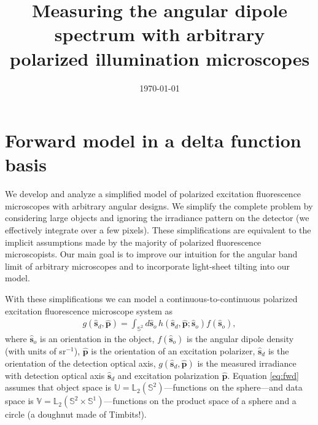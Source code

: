 \documentclass[11pt]{article}
\providecommand{\so}{\mathbf{\hat{s}}_o}
\providecommand{\sd}{\mathbf{\hat{s}}_d}
\providecommand{\pp}{\mathbf{\hat{p}}}
\providecommand{\mbb}[1]{\mathbb{#1}}
\providecommand{\ints}[1]{\int_{\mbb{S}^{#1}}}
\begin{document}
\title{\vspace{-2.5em} Measuring the angular dipole spectrum with arbitrary\\
  polarized illumination microscopes\vspace{-1em}} %
\date{\vspace{-3em}\today\vspace{-1em}}
\maketitle
\section{Forward model in a delta function basis}
We develop and analyze a simplified model of polarized excitation fluorescence
microscopes with arbitrary angular designs. We simplify the complete problem by
considering large objects and ignoring the irradiance pattern on the detector
(we effectively integrate over a few pixels). These simplifications are
equivalent to the implicit assumptions made by the majority of polarized
fluorescence microscopists. Our main goal is to improve our intuition for the
angular band limit of arbitrary microscopes and to incorporate light-sheet
tilting into our model.

With these simplifications we can model a continuous-to-continuous polarized
excitation fluorescence microscope system as
\begin{align}
  g(\sd, \pp) = \ints{2}d\so\, h(\sd,\pp;\so)f(\so),\label{eq:fwd}
\end{align}
where $\so$ is an orientation in the object, $f(\so)$ is the angular dipole
density (with units of sr${}^{-1}$), $\pp$ is the orientation of an excitation
polarizer, $\sd$ is the orientation of the detection optical axis, $g(\sd, \pp)$
is the measured irradiance with detection optical axis $\sd$ and excitation
polarization $\pp$. Equation \eqref{eq:fwd} assumes that object space is
$\mbb{U} = \mbb{L}_2(\mbb{S}^2)$---functions on the sphere---and data space is
$\mbb{V} = \mbb{L}_2(\mbb{S}^2 \times \mbb{S}^1)$---functions on the product
space of a sphere and a circle (a doughnut made of Timbits!).
\end{document}
